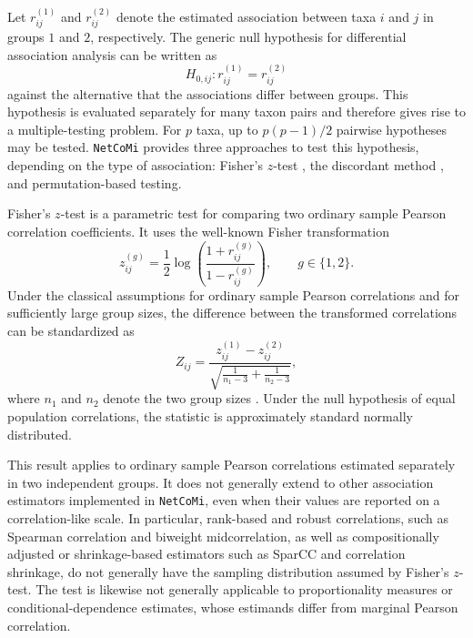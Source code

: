 Let $r_{ij}^{(1)}$ and $r_{ij}^{(2)}$ denote the estimated association between taxa $i$ and $j$ in groups $1$ and $2$, respectively. The generic null hypothesis for differential association analysis can be written as
\begin{equation}
\label{eq:5net:net_comparison:differential_association_hypothesis}
H_{0,ij}: r_{ij}^{(1)} = r_{ij}^{(2)}
\end{equation}
against the alternative that the associations differ between groups. This hypothesis is evaluated separately for many taxon pairs and therefore gives rise to a multiple-testing problem. For $p$ taxa, up to $p(p-1)/2$ pairwise hypotheses may be tested. \texttt{NetCoMi} provides three approaches to test this hypothesis, depending on the type of association: Fisher's $z$-test \citep{fisher1992statistical}, the discordant method \citep{siska2016discordant}, and permutation-based testing. 

\newpage
Fisher's $z$-test is a parametric test for comparing two ordinary sample Pearson correlation coefficients. It uses the well-known Fisher transformation \citep{fisher1921probable}
\begin{equation}
\label{eq:5net:net_comparison:fisher_z_transformation}
z_{ij}^{(g)} = \frac{1}{2}\log\left(\frac{1+r_{ij}^{(g)}}{1-r_{ij}^{(g)}}\right),
\qquad g \in \{1,2\}.
\end{equation}
Under the classical assumptions for ordinary sample Pearson correlations and for sufficiently large group sizes, the difference between the transformed correlations can be standardized as
\begin{equation}
\label{eq:5net:net_comparison:fisher_z_test}
Z_{ij} =
\frac{z_{ij}^{(1)} - z_{ij}^{(2)}}
{\sqrt{\frac{1}{n_1-3}+\frac{1}{n_2-3}}},
\end{equation}
where $n_1$ and $n_2$ denote the two group sizes \citep{fisher1992statistical}. Under the null hypothesis of equal population correlations, the statistic is approximately standard normally distributed.

This result applies to ordinary sample Pearson correlations estimated separately in two independent groups. It does not generally extend to other association estimators implemented in \texttt{NetCoMi}, even when their values are reported on a correlation-like scale. In particular, rank-based and robust correlations, such as Spearman correlation and biweight midcorrelation, as well as compositionally adjusted or shrinkage-based estimators such as SparCC and correlation shrinkage, do not generally have the sampling distribution assumed by Fisher's $z$-test. The test is likewise not generally applicable to proportionality measures or conditional-dependence estimates, whose estimands differ from marginal Pearson correlation.

